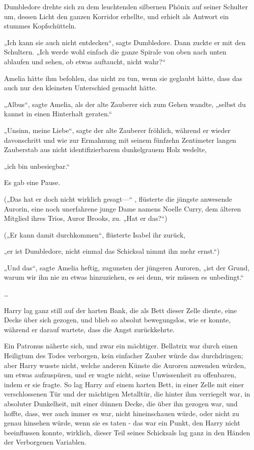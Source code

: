 {Dumbledore drehte sich zu dem leuchtenden silbernen Phönix auf seiner Schulter um, dessen Licht den ganzen Korridor erhellte, und erhielt als Antwort ein stummes Kopfschütteln.

„Ich kann sie auch nicht entdecken“, sagte Dumbledore. Dann zuckte er mit den Schultern. „Ich werde wohl einfach die ganze Spirale von oben nach unten ablaufen und sehen, ob etwas auftaucht, nicht wahr?“

Amelia hätte ihm befohlen, das nicht zu tun, wenn sie geglaubt hätte, dass das auch nur den kleinsten Unterschied gemacht hätte.

„Albus“, sagte Amelia, als der alte Zauberer sich zum Gehen wandte, „selbst du kannst in einen Hinterhalt geraten.“

„Unsinn, meine Liebe“, sagte der alte Zauberer fröhlich, während er wieder davonschritt und wie zur Ermahnung mit seinem fünfzehn Zentimeter langen Zauberstab aus nicht identifizierbarem dunkelgrauem Holz wedelte,

„ich bin unbesiegbar.“

Es gab eine Pause.

(„Das hat er doch nicht wirklich gesagt—“ , flüsterte die jüngste anwesende Aurorin, eine noch unerfahrene junge Dame namens Noelle Curry, dem älteren Mitglied ihres Trios, Auror Brooks, zu. „Hat er das?“)

(„Er kann damit durchkommen“, flüsterte Isabel ihr zurück,

„er ist Dumbledore, nicht einmal das Schicksal nimmt ihn mehr ernst.“)

„Und das“, sagte Amelia heftig, zugunsten der jüngeren Auroren, „ist der Grund, warum wir ihn nie zu etwas hinzuziehen, es sei denn, wir müssen es unbedingt.“

…

Harry lag ganz still auf der harten Bank, die als Bett dieser Zelle diente, eine Decke über sich gezogen, und blieb so absolut bewegungslos, wie er konnte, während er darauf wartete, dass die Angst zurückkehrte.

Ein Patronus näherte sich, und zwar ein mächtiger. Bellatrix war durch einen Heiligtum des Todes verborgen, kein einfacher Zauber würde das durchdringen; aber Harry wusste nicht, welche anderen Künste die Auroren anwenden würden, um etwas aufzuspüren, und er wagte nicht, seine Unwissenheit zu offenbaren, indem er sie fragte. So lag Harry auf einem harten Bett, in einer Zelle mit einer verschlossenen Tür und der mächtigen Metalltür, die hinter ihm verriegelt war, in absoluter Dunkelheit, mit einer dünnen Decke, die über ihn gezogen war, und hoffte, dass, wer auch immer es war, nicht hineinschauen würde, oder nicht zu genau hinsehen würde, wenn sie es taten - das war ein Punkt, den Harry nicht beeinflussen konnte, wirklich, dieser Teil seines Schicksals lag ganz in den Händen der Verborgenen Variablen.

}
